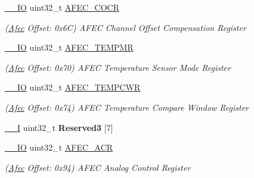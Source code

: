 \begin{DoxyCompactItemize}
\mbox{\hyperlink{core__cm7_8h_aec43007d9998a0a0e01faede4133d6be}{\+\_\+\+\_\+\+IO}} uint32\+\_\+t \mbox{\hyperlink{structAfec_a24451f90e1e0434b5f6b8522066fdc67}{A\+F\+E\+C\+\_\+\+C\+O\+CR}}
\begin{DoxyCompactList}\small\item\em (\mbox{\hyperlink{structAfec}{Afec}} Offset\+: 0x6C) A\+F\+EC Channel Offset Compensation Register \end{DoxyCompactList}\item 
\mbox{\label{structAfec_a8422ca0c9f24c0298228beeae159b9df}} 
\mbox{\hyperlink{core__cm7_8h_aec43007d9998a0a0e01faede4133d6be}{\+\_\+\+\_\+\+IO}} uint32\+\_\+t \mbox{\hyperlink{structAfec_a8422ca0c9f24c0298228beeae159b9df}{A\+F\+E\+C\+\_\+\+T\+E\+M\+P\+MR}}
\begin{DoxyCompactList}\small\item\em (\mbox{\hyperlink{structAfec}{Afec}} Offset\+: 0x70) A\+F\+EC Temperature Sensor Mode Register \end{DoxyCompactList}\item 
\mbox{\label{structAfec_a7fd7492511e01f9b5b480053fdbee28e}} 
\mbox{\hyperlink{core__cm7_8h_aec43007d9998a0a0e01faede4133d6be}{\+\_\+\+\_\+\+IO}} uint32\+\_\+t \mbox{\hyperlink{structAfec_a7fd7492511e01f9b5b480053fdbee28e}{A\+F\+E\+C\+\_\+\+T\+E\+M\+P\+C\+WR}}
\begin{DoxyCompactList}\small\item\em (\mbox{\hyperlink{structAfec}{Afec}} Offset\+: 0x74) A\+F\+EC Temperature Compare Window Register \end{DoxyCompactList}\item 
\mbox{\label{structAfec_a9a5084eb5204cf727cddaa82bbdd3afa}} 
\mbox{\hyperlink{core__cm7_8h_af63697ed9952cc71e1225efe205f6cd3}{\+\_\+\+\_\+I}} uint32\+\_\+t {\bfseries Reserved3} \mbox{[}7\mbox{]}
\item 
\mbox{\label{structAfec_a57a6c900fa0bf41a7af4b2163d844553}} 
\mbox{\hyperlink{core__cm7_8h_aec43007d9998a0a0e01faede4133d6be}{\+\_\+\+\_\+\+IO}} uint32\+\_\+t \mbox{\hyperlink{structAfec_a57a6c900fa0bf41a7af4b2163d844553}{A\+F\+E\+C\+\_\+\+A\+CR}}
\begin{DoxyCompactList}\small\item\em (\mbox{\hyperlink{structAfec}{Afec}} Offset\+: 0x94) A\+F\+EC Analog Control Register \end{DoxyCompactList}\item 

\end{DoxyCompactItemize}
